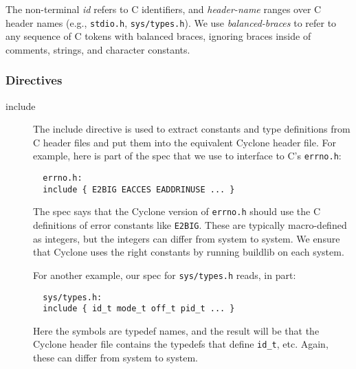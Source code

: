 The non-terminal \hypertarget{id}{\textit{id}} refers
to C identifiers, and \hypertarget{header-name}{\textit{header-name}}
ranges over C header names (e.g., \texttt{stdio.h},
\texttt{sys/types.h}).  We use
\hypertarget{balanced-braces}{\textit{balanced-braces}} to refer to any
sequence of C tokens with balanced braces, ignoring braces inside of
comments, strings, and character constants.

\subsubsection*{Directives}

\begin{description}
\item[include] The include directive is used to extract constants and
type definitions from C header files and put them into the equivalent
Cyclone header file.  For example, here is part of the spec that we
use to interface to C's \texttt{errno.h}:
\begin{verbatim}
  errno.h:
  include { E2BIG EACCES EADDRINUSE ... }
\end{verbatim}
The spec says that the Cyclone version of \texttt{errno.h} should use
the C definitions of error constants like \texttt{E2BIG}.  These are
typically macro-defined as integers, but the integers can differ from
system to system.  We ensure that Cyclone uses the right constants by
running buildlib on each system.

For another example, our spec for \texttt{sys/types.h} reads, in part:
\begin{verbatim}
  sys/types.h:
  include { id_t mode_t off_t pid_t ... }
\end{verbatim}
Here the symbols are typedef names, and the result will be that the
Cyclone header file contains the typedefs that define \texttt{id_t},
etc.  Again, these can differ from system to system.


\end{description}
